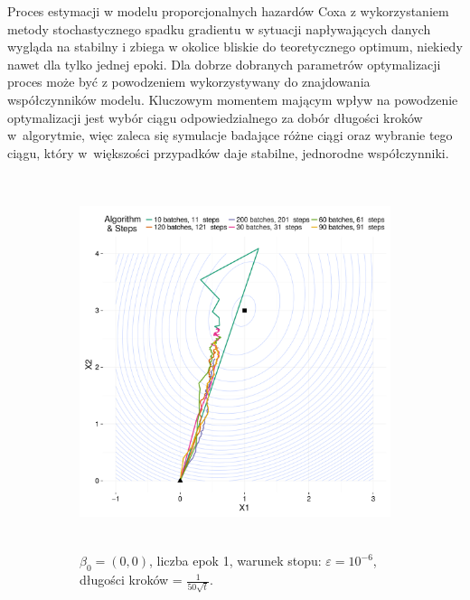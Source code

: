 Proces estymacji w modelu proporcjonalnych hazardów Coxa z wykorzystaniem metody stochastycznego spadku gradientu w sytuacji napływających danych wygląda na stabilny i zbiega w okolice bliskie do teoretycznego optimum, niekiedy nawet dla tylko jednej epoki. Dla dobrze dobranych parametrów optymalizacji proces może być z powodzeniem wykorzystywany do znajdowania współczynników modelu. Kluczowym momentem mającym wpływ na powodzenie optymalizacji jest wybór ciągu odpowiedzialnego za dobór długości kroków w~algorytmie, więc zaleca się symulacje badające różne ciągi oraz wybranie tego ciągu, który w~większości przypadków daje stabilne, jednorodne współczynniki. 

\begin{figure}[hbt!]
  \begin{center}
   \begin{subfigure}[h!]{0.9\textwidth}
      \includegraphics[width=\textwidth, height=310pt]{Obrazki/b_0_0_iter_1_e-6_50sqrt.pdf}
      \caption{$\beta_0=(0,0)$, liczba epok 1, warunek stopu: $\varepsilon=10^{-6}$, długości kroków = $\frac{1}{50\sqrt{t}}$.}
   \end{subfigure}     
   \begin{subfigure}[h!]{0.9\textwidth}

\end{subfigure}
\end{center}
\end{figure}
